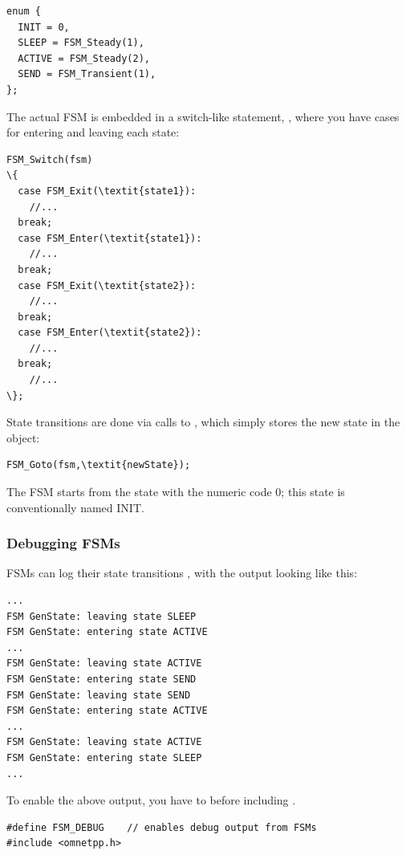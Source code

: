 \begin{verbatim}
enum {
  INIT = 0,
  SLEEP = FSM_Steady(1),
  ACTIVE = FSM_Steady(2),
  SEND = FSM_Transient(1),
};
\end{verbatim}



The actual FSM is embedded in a switch-like statement,
, where you have cases for entering and leaving
each state:


\begin{Verbatim}[commandchars=\\\{\}]
FSM_Switch(fsm)
\{
  case FSM_Exit(\textit{state1}):
    //...
  break;
  case FSM_Enter(\textit{state1}):
    //...
  break;
  case FSM_Exit(\textit{state2}):
    //...
  break;
  case FSM_Enter(\textit{state2}):
    //...
  break;
    //...
\};
\end{Verbatim}


State transitions are done via calls to
, which simply stores the new state in the
 object:

\begin{Verbatim}[commandchars=\\\{\}]
FSM_Goto(fsm,\textit{newState});
\end{Verbatim}

The FSM starts from the state with the numeric code 0; this state
is conventionally named INIT.


\subsubsection{Debugging FSMs}

FSMs can log their state transitions ,
with the output looking like this:

\begin{verbatim}
...
FSM GenState: leaving state SLEEP
FSM GenState: entering state ACTIVE
...
FSM GenState: leaving state ACTIVE
FSM GenState: entering state SEND
FSM GenState: leaving state SEND
FSM GenState: entering state ACTIVE
...
FSM GenState: leaving state ACTIVE
FSM GenState: entering state SLEEP
...
\end{verbatim}

To enable the above output, you have to 
before including .

\begin{Verbatim}[commandchars=\\\{\}]
#define FSM_DEBUG    // enables debug output from FSMs
#include <omnetpp.h>
\end{Verbatim}

